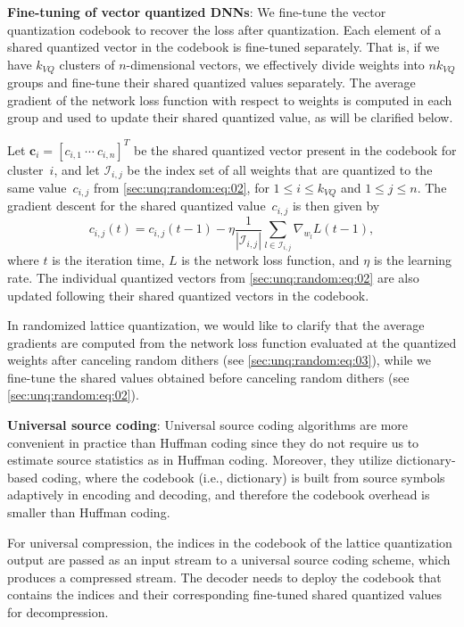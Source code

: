 \documentclass{article}
\theoremstyle{remark}
\begin{document}
\textbf{Fine-tuning of vector quantized DNNs}: We fine-tune the vector quantization codebook to recover the loss after quantization. Each element of a shared quantized vector in the codebook is fine-tuned separately. That is, if we have $k_\textit{VQ}$ clusters of $n$-dimensional vectors, we effectively divide weights into $nk_\textit{VQ}$ groups and fine-tune their shared quantized values separately. The average gradient of the network loss function with respect to weights is computed in each group and used to update their shared quantized value, as will be clarified below.

Let $\mathbf{c}_i=[c_{i,1}\ \cdots\ c_{i,n}]^T$ be the shared quantized vector present in the codebook for cluster~$i$, and let $\mathcal{I}_{i,j}$ be the index set of all weights that are quantized to the same value~$c_{i,j}$ from \eqref{sec:unq:random:eq:02}, for $1\leq i\leq k_\textit{VQ}$ and $1\leq j\leq n$. The gradient descent for the shared quantized value~$c_{i,j}$ is then given by
\begin{equation}
c_{i,j}(t)
=c_{i,j}(t-1)-\eta\frac{1}{|\mathcal{I}_{i,j}|}\sum_{l\in\mathcal{I}_{i,j}}\nabla_{w_l}L(t-1),
\end{equation}
where $t$ is the iteration time, $L$ is the network loss function, and $\eta$ is the learning rate. The individual quantized vectors from \eqref{sec:unq:random:eq:02} are also updated following their shared quantized vectors in the codebook.

In randomized lattice quantization, we would like to clarify that the average gradients are computed from the network loss function evaluated at the quantized weights after canceling random dithers (see \eqref{sec:unq:random:eq:03}), while we fine-tune the shared values obtained before canceling random dithers (see \eqref{sec:unq:random:eq:02}).

\textbf{Universal source coding}: Universal source coding algorithms are more convenient in practice than Huffman coding since they do not require us to estimate source statistics as in Huffman coding. Moreover, they utilize dictionary-based coding, where the codebook (i.e., dictionary) is built from source symbols adaptively in encoding and decoding, and therefore the codebook overhead is smaller than Huffman coding.%

For universal compression, the indices in the codebook of the lattice quantization output are passed as an input stream to a universal source coding scheme, which produces a compressed stream. The decoder needs to deploy the codebook that contains the indices and their corresponding fine-tuned shared quantized values for decompression.
\end{document}
